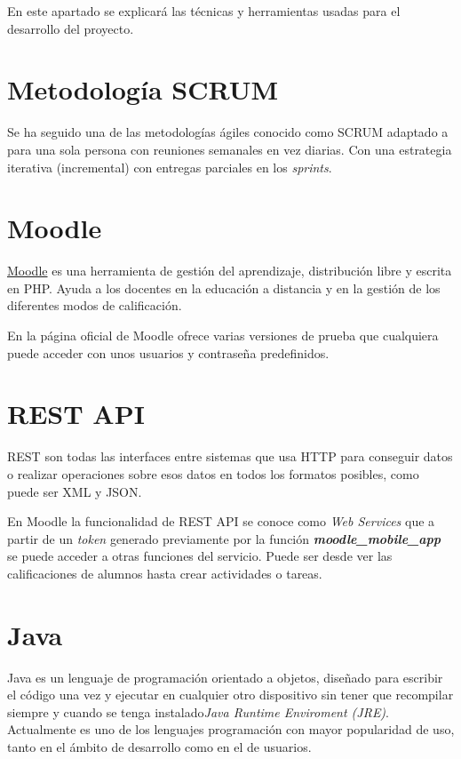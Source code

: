 
En este apartado se explicará las técnicas y herramientas usadas para el desarrollo del proyecto.

\section{Metodología SCRUM}

Se ha seguido una de las metodologías ágiles conocido como SCRUM adaptado a para una sola persona con reuniones semanales en vez diarias. Con una estrategia iterativa (incremental) con entregas parciales en los \textit{sprints}.

\section{Moodle}
\href{https://moodle.org}{Moodle} es una herramienta de gestión del aprendizaje, distribución libre y escrita en PHP. Ayuda a los docentes en la educación a distancia y en la gestión de los diferentes modos de calificación.

En la página oficial de Moodle ofrece varias versiones de prueba que cualquiera puede acceder con unos usuarios y contraseña predefinidos.

\section{REST API}
REST \cite{noauthor_api_nodate} son todas las interfaces entre sistemas que usa HTTP para conseguir datos o realizar operaciones sobre esos datos en todos los formatos posibles, como puede ser XML y JSON.

En Moodle la funcionalidad de REST API se conoce como \textit{Web Services} que a partir de un \textit{token} generado previamente por la función \textbf{\textit{moodle\_mobile\_app}} se puede acceder a otras funciones del servicio. Puede ser desde ver las calificaciones de alumnos hasta crear actividades o tareas.

\section{Java}
Java es un lenguaje de programación orientado a objetos, diseñado para escribir el código una vez y ejecutar en cualquier otro dispositivo sin tener que recompilar siempre y cuando se tenga instalado\textit{Java Runtime Enviroment (JRE)}. Actualmente es uno de los lenguajes programación con mayor popularidad de uso, tanto en el ámbito de desarrollo como en el de usuarios.

